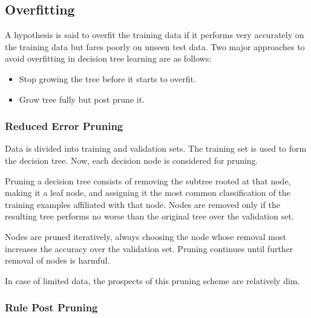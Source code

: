 \documentclass[11pt, a4paper]{article}
\begin{document}
\FloatBarrier\clearpage

\subsection{Overfitting}

A hypothesis is said to overfit the training data if it performs very accurately on the training data but fares poorly on unseen test data. Two major approaches to avoid overfitting in decision tree learning are as follows:

\begin{itemize}
	\item Stop growing the tree before it starts to overfit.
	\item Grow tree fully but post prune it.
\end{itemize}

\subsubsection{Reduced Error Pruning}
Data is divided into training and validation sets. The training set is used to form the decision tree. Now, each decision node is considered for pruning. 

Pruning a decision tree consists of removing the subtree rooted at that node, making it a leaf node, and assigning it the most common classification of the training examples affiliated with that node. Nodes are removed only if the resulting tree performs no worse than the original tree over the validation set. 

Nodes are pruned iteratively, always choosing the node whose removal most increases the accuracy over the validation set. Pruning continues until further removal of nodes is harmful.

In case of limited data, the prospects of this pruning scheme are relatively dim. 

\subsubsection{Rule Post Pruning}
\end{document}
